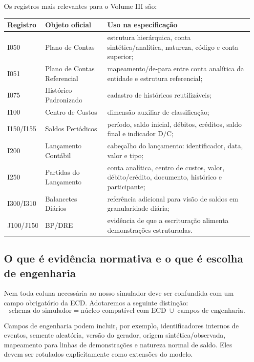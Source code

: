 \documentclass[11pt,a4paper]{article}
\begin{document}
Os registros mais relevantes para o Volume III são:
\begin{longtable}{p{} p{} p{}}
\toprule
\textbf{Registro} & \textbf{Objeto oficial} & \textbf{Uso na especificação}\\
\midrule
I050 & Plano de Contas & estrutura hierárquica, conta sintética/analítica, natureza, código e conta superior;\\
I051 & Plano de Contas Referencial & mapeamento/de-para entre conta analítica da entidade e estrutura referencial;\\
I075 & Histórico Padronizado & cadastro de históricos reutilizáveis;\\
I100 & Centro de Custos & dimensão auxiliar de classificação;\\
I150/I155 & Saldos Periódicos & período, saldo inicial, débitos, créditos, saldo final e indicador D/C;\\
I200 & Lançamento Contábil & cabeçalho do lançamento: identificador, data, valor e tipo;\\
I250 & Partidas do Lançamento & conta analítica, centro de custos, valor, débito/crédito, documento, histórico e participante;\\
I300/I310 & Balancetes Diários & referência adicional para visão de saldos em granularidade diária;\\
J100/J150 & BP/DRE & evidência de que a escrituração alimenta demonstrações estruturadas.\\
\bottomrule
\end{longtable}

\subsection{O que é evidência normativa e o que é escolha de engenharia}

Nem toda coluna necessária ao nosso simulador deve ser confundida com um campo obrigatório da ECD. Adotaremos a seguinte distinção:
\begin{equation}
\boxed{
\text{schema do simulador}
=
\text{núcleo compatível com ECD}
\;\cup\;
\text{campos de engenharia}.
}
\end{equation}

Campos de engenharia podem incluir, por exemplo, identificadores internos de eventos, semente aleatória, versão do gerador, origem sintética/observada, mapeamento para linhas de demonstrações e natureza normal de saldo. Eles devem ser rotulados explicitamente como extensões do modelo.
\end{document}

